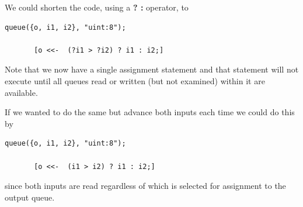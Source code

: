     We could shorten the code, using a {\bf? :} operator, to
    \begin{lstlisting}[gobble=4, language=threepl]
       queue({o, i1, i2}, "uint:8");

       [o <<-  (?i1 > ?i2) ? i1 : i2;]
    \end{lstlisting}
    Note that we now have a single assignment statement and
    that statement will not execute until all queues read or written
    (but not examined) within it are available.

    If we wanted to do the same but advance both inputs
    each time we could do this by
    \begin{lstlisting}[gobble=4, language=threepl]
       queue({o, i1, i2}, "uint:8");

       [o <<-  (i1 > i2) ? i1 : i2;]
    \end{lstlisting}
    since both inputs are read regardless of which is selected
    for assignment to the output queue.

